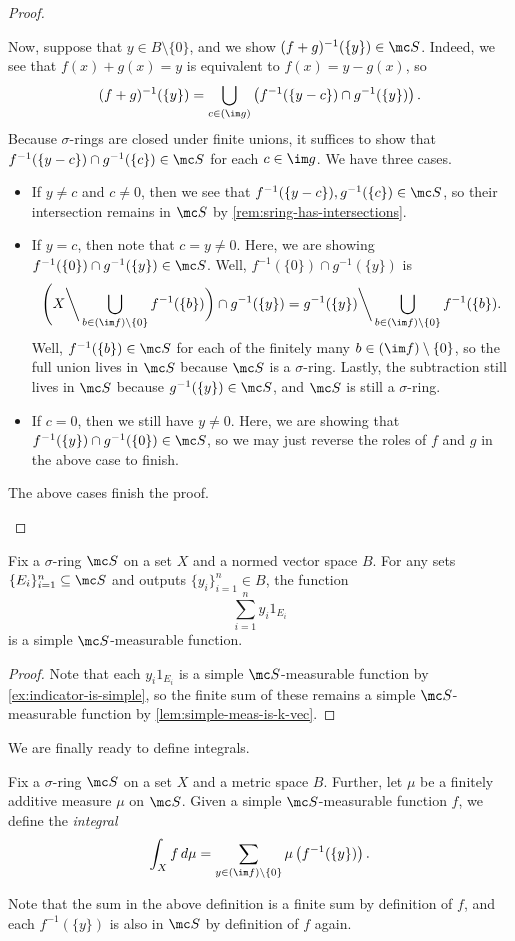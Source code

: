 \documentclass[../notes.tex]{subfiles}
\begin{document}
\begin{proof}
\begin{itemize}
		Now, suppose that $y\in B\setminus\{0\}$, and we show $(f+g)^{-1}(\{y\})\in\mc S$. Indeed, we see that $f(x)+g(x)=y$ is equivalent to $f(x)=y-g(x)$, so
		\[(f+g)^{-1}(\{y\})=\bigcup_{c\in(\im g)}\left(f^{-1}(\{y-c\})\cap g^{-1}(\{y\})\right).\]
		Because $\sigma$-rings are closed under finite unions, it suffices to show that $f^{-1}(\{y-c\})\cap g^{-1}(\{c\})\in\mc S$ for each $c\in\im g$. We have three cases.
		\begin{itemize}
			\item If $y\ne c$ and $c\ne0$, then we see that $f^{-1}(\{y-c\}),g^{-1}(\{c\})\in\mc S$, so their intersection remains in $\mc S$ by \autoref{rem:sring-has-intersections}.
			\item If $y=c$, then note that $c=y\ne0$. Here, we are showing $f^{-1}(\{0\})\cap g^{-1}(\{y\})\in\mc S$. Well, $f^{-1}(\{0\})\cap g^{-1}(\{y\})$ is
			\[\Bigg(X{\mathbin\bigg\backslash}\bigcup_{b\in(\im f)\setminus\{0\}}f^{-1}(\{b\})\bigg)\cap g^{-1}(\{y\})=g^{-1}(\{y\}){\mathbin\bigg\backslash}\bigcup_{b\in(\im f)\setminus\{0\}}f^{-1}(\{b\}).\]
			Well, $f^{-1}(\{b\})\in\mc S$ for each of the finitely many $b\in(\im f)\setminus\{0\}$, so the full union lives in $\mc S$ because $\mc S$ is a $\sigma$-ring. Lastly, the subtraction still lives in $\mc S$ because $g^{-1}(\{y\})\in\mc S$, and $\mc S$ is still a $\sigma$-ring.
			\item If $c=0$, then we still have $y\ne0$. Here, we are showing that $f^{-1}(\{y\})\cap g^{-1}(\{0\})\in\mc S$, so we may just reverse the roles of $f$ and $g$ in the above case to finish.
		\end{itemize}
		The above cases finish the proof.
		\qedhere
	\end{itemize}
\end{proof}
\begin{corollary}
	Fix a $\sigma$-ring $\mc S$ on a set $X$ and a normed vector space $B$. For any sets $\{E_i\}_{i=1}^n\subseteq\mc S$ and outputs $\{y_i\}_{i=1}^n\in B$, the function
	\[\sum_{i=1}^ny_i1_{E_i}\]
	is a simple $\mc S$-measurable function.
\end{corollary}
\begin{proof}
	Note that each $y_i1_{E_i}$ is a simple $\mc S$-measurable function by \autoref{ex:indicator-is-simple}, so the finite sum of these remains a simple $\mc S$-measurable function by \autoref{lem:simple-meas-is-k-vec}.
\end{proof}
We are finally ready to define integrals.
\begin{definition}[Integral]
	Fix a $\sigma$-ring $\mc S$ on a set $X$ and a metric space $B$. Further, let $\mu$ be a finitely additive measure $\mu$ on $\mc S$. Given a simple $\mc S$-measurable function $f$, we define the \textit{integral}
	\[\int_Xf\,d\mu=\sum_{y\in(\im f)\setminus\{0\}}\mu\left(f^{-1}(\{y\})\right).\]
\end{definition}
Note that the sum in the above definition is a finite sum by definition of $f$, and each $f^{-1}(\{y\})$ is also in $\mc S$ by definition of $f$ again.
\end{document}
